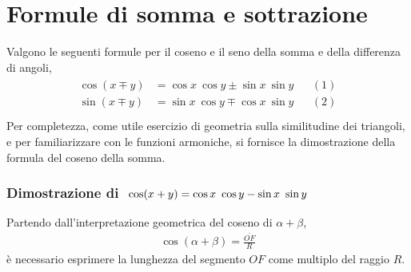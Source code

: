 \documentclass[letterpaper,10pt,italian]{jupyterBook}
\begin{document}
\section{Formule di somma e sottrazione}
\label{\detokenize{ch/trigonometry:formule-di-somma-e-sottrazione}}
\sphinxAtStartPar
Valgono le seguenti formule per il coseno e il seno della somma e della differenza di angoli,
\begin{equation}\label{equation:ch/trigonometry:eq:trigonometry:sum-diff}
\begin{split}\begin{aligned}
  \cos ( x \mp y ) & = \cos x \ \cos y \pm \sin x \ \sin y && (1) \\
  \sin ( x \mp y ) & = \sin x \ \cos y \mp \cos x \ \sin y && (2) \\
\end{aligned}\end{split}
\end{equation}
\sphinxAtStartPar
Per completezza, come utile esercizio di geometria sulla similitudine dei triangoli, e per familiarizzare con le funzioni armoniche, si fornisce la dimostrazione della formula del coseno della somma.
\subsubsection*{Dimostrazione di \protect\(\ \cos ( x + y ) = \cos x \ \cos y - \sin x \ \sin y\protect\)}

\begin{figure}[htbp]
\centering

\noindent{}
\end{figure}

\sphinxAtStartPar
Partendo dall’interpretazione geometrica del coseno di \(\alpha + \beta\),
\begin{equation*}
\begin{split}\cos ( \alpha + \beta ) = \frac{\overline{OF}}{R}\end{split}
\end{equation*}
\sphinxAtStartPar
è necessario esprimere la lunghezza del segmento \(OF\) come multiplo del raggio \(R\).
\end{document}
